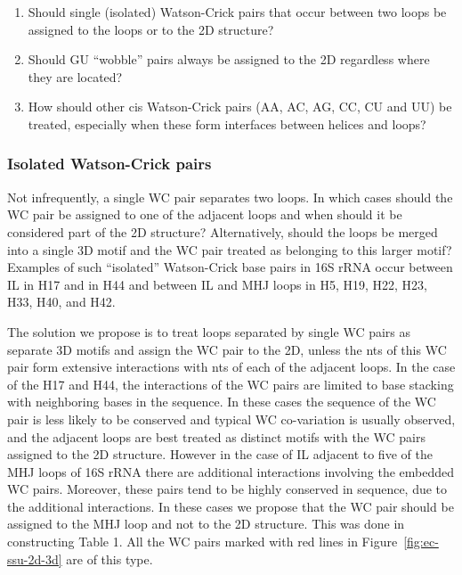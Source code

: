 \begin{enumerate}
  \item Should single (isolated) Watson-Crick pairs that occur between two loops
    be assigned to the loops or to the 2D structure? 

  \item Should GU ``wobble'' pairs always be assigned to the 2D regardless where
    they are located? 

  \item How should other cis Watson-Crick pairs (AA, AC, AG, CC, CU and UU) be
    treated, especially when these form interfaces between helices and loops? 
\end{enumerate}

\subsubsection{Isolated Watson-Crick pairs}

Not infrequently, a single WC pair separates two loops. In which cases should
the WC pair be assigned to one of the adjacent loops and when should it be
considered part of the 2D structure? Alternatively, should the loops be merged
into a single 3D motif and the WC pair treated as belonging to this larger
motif? Examples of such “isolated” Watson-Crick base pairs in 16S rRNA occur
between IL in H17 and in H44 and between IL and MHJ loops in H5, H19, H22, H23,
H33, H40, and H42. 

The solution we propose is to treat loops separated by single WC pairs as
separate 3D motifs and assign the WC pair to the 2D, unless the nts of this WC
pair form extensive interactions with nts of each of the adjacent loops. In the
case of the H17 and H44, the interactions of the WC pairs are limited to base
stacking with neighboring bases in the sequence. In these cases the sequence of
the WC pair is less likely to be conserved and typical WC co-variation is
usually observed, and the adjacent loops are best treated as distinct motifs
with the WC pairs assigned to the 2D structure. However in the case of IL
adjacent to five of the MHJ loops of 16S rRNA there are additional interactions
involving the embedded WC pairs. Moreover, these pairs tend to be highly
conserved in sequence, due to the additional interactions. In these cases we
propose that the WC pair should be assigned to the MHJ loop and not to the 2D
structure. This was done in constructing Table 1. All the WC pairs marked with
red lines in Figure~\ref{fig:ec-ssu-2d-3d}  are of this type. 

